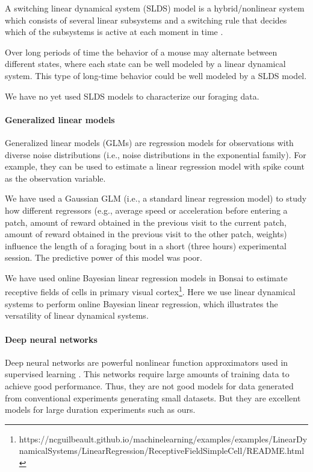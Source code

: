 A switching linear dynamical system (SLDS) model is a hybrid/nonlinear system which
consists of several linear subsystems and a switching rule that decides which
of the subsystems is active at each moment in time \citep[Section
18.6]{murphy12}.

Over long periods of time the behavior of a mouse may alternate between
different states, where each state can be well modeled by a linear dynamical
system. This type of long-time behavior could be well modeled by a SLDS model.

We have no yet used SLDS models to characterize our foraging data.

\paragraph{Generalized linear models}

Generalized linear models (GLMs) are regression models for observations with diverse
noise distributions (i.e., noise distributions in the exponential family). For
example, they can be used to estimate a linear regression model with spike
count as the observation variable.

We have used a Gaussian GLM (i.e., a standard linear regression model) to
study how different regressors (e.g., average speed or acceleration
before entering a patch, amount of reward obtained in the previous visit to the
current patch, amount of reward obtained in the previous visit to the other
patch, weights) influence the length of a foraging bout in a short (three
hours) experimental session. The predictive power of this model was poor.

We have used online Bayesian linear regression models in Bonsai to estimate
receptive fields of cells in primary visual
cortex\footnote{https://ncguilbeault.github.io/machinelearning/examples/examples/LinearDynamicalSystems/LinearRegression/ReceptiveFieldSimpleCell/README.html}.
Here we use linear dynamical systems to perform online Bayesian linear
regression, which illustrates the versatility of linear dynamical systems.

\paragraph{Deep neural networks}

Deep neural networks are powerful nonlinear function approximators used in
supervised learning \citep{goodfellowEtAl16}. This networks require large
amounts of training data to achieve good performance. Thus, they are not good
models for data generated from conventional experiments generating small
datasets. But they are excellent models for large duration experiments such as
ours.

